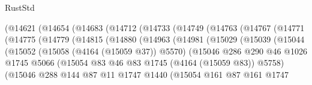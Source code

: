 \begin{lexlean}{RustStd}
\begin{coremodule}
                  (@14621
                    (@14654
                      (@14683
                        (@14712
                          (@14733
                            (@14749
                              (@14763
                                (@14767
                                  (@14771
                                    (@14775
                                      (@14779
                                        (@14815
                                          (@14880
                                            (@14963
                                              (@14981
                                                (@15029
                                                  (@15039
                                                    (@15044
                                                      (@15052
                                                        (@15058 (@4164 (@15059 @37)) @5570)
                                                        (@15046
                                                          @286
                                                          @290
                                                          @46
                                                          @1026
                                                          @1745
                                                          @5066
                                                          (@15054
                                                            @83
                                                            @46
                                                            @83
                                                            @1745
                                                            (@4164 (@15059 @83))
                                                            @5758)
                                                          (@15046
                                                            @288
                                                            @144
                                                            @87
                                                            @11
                                                            @1747
                                                            @1440
                                                            (@15054
                                                              @161
                                                              @87
                                                              @161
                                                              @1747

\end{coremodule}
\end{lexlean}
